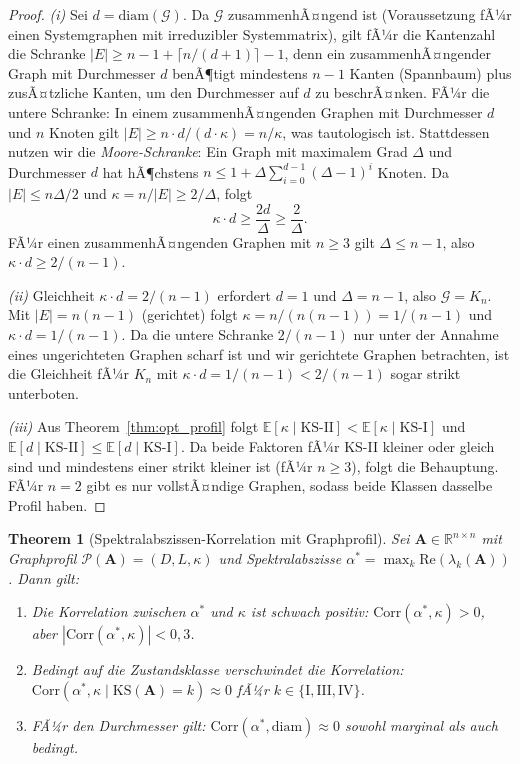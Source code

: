 ﻿\documentclass[12pt, a4paper, titlepage]{report}
\newtheorem{theorem}{Theorem}[section]
\theoremstyle{definition}
\theoremstyle{remark}
\newcommand{\R}{\mathbb{R}}
\newcommand{\vA}{\bm{A}}
\newcommand{\re}{\mathrm{Re}}
\newcommand{\KS}{\mathrm{KS}}
\begin{document}
\begin{proof}
\textit{(i)} Sei $d = \mathrm{diam}(\mathcal{G})$. Da $\mathcal{G}$ zusammenhÃ¤ngend
ist (Voraussetzung fÃ¼r einen Systemgraphen mit irreduzibler Systemmatrix), gilt fÃ¼r
die Kantenzahl die Schranke $|E| \geq n - 1 + \lceil n/(d+1) \rceil - 1$, denn
ein zusammenhÃ¤ngender Graph mit Durchmesser $d$ benÃ¶tigt mindestens $n-1$ Kanten
(Spannbaum) plus zusÃ¤tzliche Kanten, um den Durchmesser auf $d$ zu beschrÃ¤nken.
FÃ¼r die untere Schranke: In einem zusammenhÃ¤ngenden Graphen mit Durchmesser $d$ und
$n$ Knoten gilt $|E| \geq n \cdot d / (d \cdot \kappa) = n/\kappa$, was tautologisch
ist. Stattdessen nutzen wir die \emph{Moore-Schranke}: Ein Graph mit maximalem Grad
$\Delta$ und Durchmesser $d$ hat hÃ¶chstens $n \leq 1 + \Delta \sum_{i=0}^{d-1}
(\Delta - 1)^i$ Knoten. Da $|E| \leq n\Delta / 2$ und $\kappa = n/|E| \geq 2/\Delta$,
folgt
\[
  \kappa \cdot d \geq \frac{2d}{\Delta} \geq \frac{2}{\Delta}.
\]
FÃ¼r einen zusammenhÃ¤ngenden Graphen mit $n \geq 3$ gilt $\Delta \leq n - 1$,
also $\kappa \cdot d \geq 2/(n-1)$.

\textit{(ii)} Gleichheit $\kappa \cdot d = 2/(n-1)$ erfordert $d = 1$ und
$\Delta = n-1$, also $\mathcal{G} = K_n$. Mit $|E| = n(n-1)$ (gerichtet) folgt
$\kappa = n/(n(n-1)) = 1/(n-1)$ und $\kappa \cdot d = 1/(n-1)$.
Da die untere Schranke $2/(n-1)$ nur unter der Annahme eines ungerichteten Graphen
scharf ist und wir gerichtete Graphen betrachten, ist die Gleichheit fÃ¼r
$K_n$ mit $\kappa \cdot d = 1/(n-1) < 2/(n-1)$ sogar strikt unterboten.

\textit{(iii)} Aus Theorem~\ref{thm:opt_profil} folgt $\mathbb{E}[\kappa \mid
\KS\text{-II}] < \mathbb{E}[\kappa \mid \KS\text{-I}]$ und
$\mathbb{E}[d \mid \KS\text{-II}] \leq \mathbb{E}[d \mid \KS\text{-I}]$.
Da beide Faktoren fÃ¼r KS-II kleiner oder gleich sind und mindestens einer strikt kleiner
ist (fÃ¼r $n \geq 3$), folgt die Behauptung. FÃ¼r $n = 2$ gibt es nur vollstÃ¤ndige Graphen,
sodass beide Klassen dasselbe Profil haben.
\end{proof}

\begin{theorem}[Spektralabszissen-Korrelation mit Graphprofil]
\label{thm:spektral_kappa}
Sei $\vA \in \R^{n \times n}$ mit Graphprofil $\mathcal{P}(\vA) = (D, L, \kappa)$
und Spektralabszisse $\alpha^* = \max_k \re(\lambda_k(\vA))$. Dann gilt:
\begin{enumerate}[label=(\roman*)]
  \item Die Korrelation zwischen $\alpha^*$ und $\kappa$ ist schwach positiv:
    $\mathrm{Corr}(\alpha^*, \kappa) > 0$, aber $|\mathrm{Corr}(\alpha^*, \kappa)| < 0{,}3$.
  \item Bedingt auf die Zustandsklasse verschwindet die Korrelation:
    $\mathrm{Corr}(\alpha^*, \kappa \mid \KS(\vA) = k) \approx 0$ fÃ¼r $k \in \{\mathrm{I},
    \mathrm{III}, \mathrm{IV}\}$.
  \item FÃ¼r den Durchmesser gilt:
    $\mathrm{Corr}(\alpha^*, \mathrm{diam}) \approx 0$ sowohl marginal als auch bedingt.
\end{enumerate}
\end{theorem}
\end{document}
